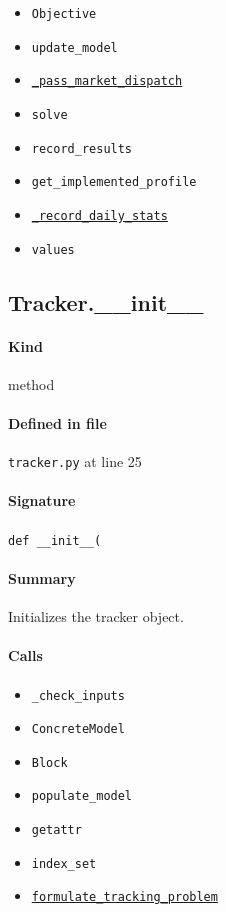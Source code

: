 \documentclass[11pt]{report}
\begin{document}
\begin{itemize}[leftmargin=*]
  \item \texttt{Objective}
  \item \texttt{update\_model}
  \item \hyperref[def:tracker.py:Tracker._pass_market_dispatch:L338]{\texttt{\_pass\_market\_dispatch}}
  \item \texttt{solve}
  \item \texttt{record\_results}
  \item \texttt{get\_implemented\_profile}
  \item \hyperref[def:tracker.py:Tracker._record_daily_stats:L315]{\texttt{\_record\_daily\_stats}}
  \item \texttt{values}
\end{itemize}
\subsection{Tracker.\_\_init\_\_}
\label{def:tracker.py:Tracker.__init__:L25}
\paragraph{Kind} method
\paragraph{Defined in file} \texttt{tracker.py} at line 25
\paragraph{Signature} \texttt{def \_\_init\_\_(}
\paragraph{Summary} Initializes the tracker object.
\paragraph{Calls}
\begin{itemize}[leftmargin=*]
  \item \texttt{\_check\_inputs}
  \item \texttt{ConcreteModel}
  \item \texttt{Block}
  \item \texttt{populate\_model}
  \item \texttt{getattr}
  \item \texttt{index\_set}
  \item \hyperref[def:tracker.py:Tracker.formulate_tracking_problem:L147]{\texttt{formulate\_tracking\_problem}}
\end{itemize}
\end{document}
